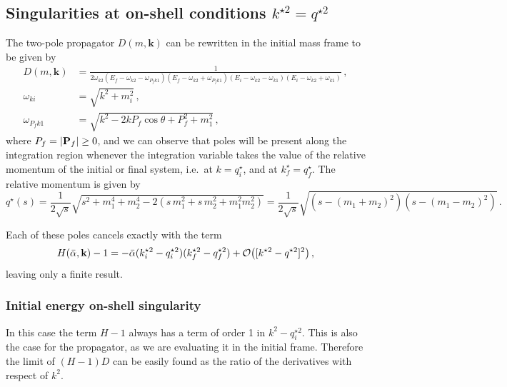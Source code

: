 \documentclass[aps,prd,onecolumn,groupedaddress]{revtex4-2}
\begin{document}
\subsection{Singularities at on-shell conditions \texorpdfstring{$k^{\star2}=q^{\star2}$}{k*2=q*2}}

The two-pole propagator $D(m, \mathbf k)$ can be rewritten in the initial mass frame to be given by
\begin{align}
    D(m, \mathbf k) &= \frac{1}{2\omega_{k2}  (E_f-\omega_{k2} - \omega_{P_fk1})
  (E_f-\omega_{k2} + \omega_{P_fk1})  (E_i-\omega_{k2} - \omega_{k1})
  (E_i-\omega_{k2} + \omega_{k1}) }\,,\\
    \omega_{ki} &= \sqrt{k^2+m_i^2}\,,\\
    \omega_{P_fk1}& = \sqrt{k^2 -2 kP_{f}\cos\theta + P_f^2 +m_1^2}\,,
\end{align}
where $P_f=\abs{\mathbf P_f}\geq0$, and we can observe that poles will be present along the integration region whenever the integration variable takes the value of the relative momentum of the initial or final system, i.e.\ at $k=q_i^\star$, and at $k^\star_f=q_f^\star$.
The relative momentum is given by
\begin{equation}
    q^\star(s) = \frac{1}{2\sqrt{s}}\sqrt{s^2+m_1^4+m_2^4-2(s\,m_1^2+s\,m_2^2+m_1^2m_2^2)} =\frac{1}{2\sqrt{s}}\sqrt{(s-(m_1+m_2)^2)(s-(m_1-m_2)^2)}\,.
\end{equation}

Each of these poles cancels exactly with the term
\begin{equation}
    H(\bar{\alpha}, \textbf k)-1 = -\bar \alpha (k^{\star 2}_i - q^{\star 2}_i) (k^{\star 2}_f - q^{\star 2}_f)
    +\mathcal{O}\qty([k^{\star2}-q^{\star2}]^2)\,,
\end{equation}
leaving only a finite result.


\subsubsection{Initial energy on-shell singularity}

In this case the term $H-1$ always has a term of order 1 in $k^2-q_i^{\star2}$.
This is also the case for the propagator, as we are evaluating it in the initial frame.
Therefore the limit of $(H-1)D$ can be easily found as the ratio of the derivatives with respect of $k^2$.
\end{document}
